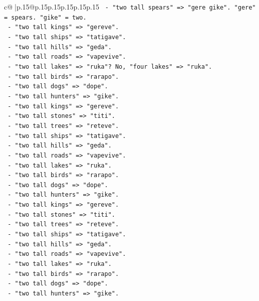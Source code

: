 \documentclass{article}
\begin{document}
{\begin{supertabular}{c@{$\;$}|p{.15\linewidth}@{}p{.15\linewidth}p{.15\linewidth}p{.15\linewidth}p{.15\linewidth}p{.15\linewidth}}
{{{\texttt{    {-} "two tall spears" => "gere gike". "gere" = spears. "gike" = two.} \\
\texttt{    {-} "two tall kings" => "gereve".} \\
\texttt{    {-} "two tall ships" => "tatigave".} \\
\texttt{    {-} "two tall hills" => "geda".} \\
\texttt{    {-} "two tall roads" => "vapevive".} \\
\texttt{    {-} "two tall lakes" => "ruka"? No, "four lakes" => "ruka".} \\
\texttt{    {-} "two tall birds" => "rarapo".} \\
\texttt{    {-} "two tall dogs" => "dope".} \\
\texttt{    {-} "two tall hunters" => "gike".} \\
\texttt{    {-} "two tall kings" => "gereve".} \\
\texttt{    {-} "two tall stones" => "titi".} \\
\texttt{    {-} "two tall trees" => "reteve".} \\
\texttt{    {-} "two tall ships" => "tatigave".} \\
\texttt{    {-} "two tall hills" => "geda".} \\
\texttt{    {-} "two tall roads" => "vapevive".} \\
\texttt{    {-} "two tall lakes" => "ruka".} \\
\texttt{    {-} "two tall birds" => "rarapo".} \\
\texttt{    {-} "two tall dogs" => "dope".} \\
\texttt{    {-} "two tall hunters" => "gike".} \\
\texttt{    {-} "two tall kings" => "gereve".} \\
\texttt{    {-} "two tall stones" => "titi".} \\
\texttt{    {-} "two tall trees" => "reteve".} \\
\texttt{    {-} "two tall ships" => "tatigave".} \\
\texttt{    {-} "two tall hills" => "geda".} \\
\texttt{    {-} "two tall roads" => "vapevive".} \\
\texttt{    {-} "two tall lakes" => "ruka".} \\
\texttt{    {-} "two tall birds" => "rarapo".} \\
\texttt{    {-} "two tall dogs" => "dope".} \\
\texttt{    {-} "two tall hunters" => "gike".} \\
}}}
\end{supertabular}}
\end{document}
